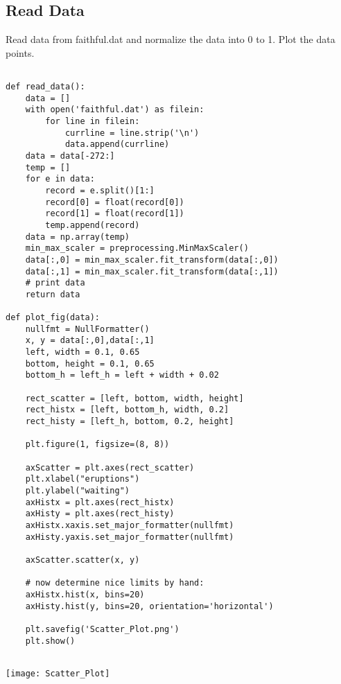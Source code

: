 \documentclass[a4paper]{article}
\begin{document}
\subsection*{Read Data}
Read data from faithful.dat and normalize the data into 0 to 1. Plot the data points.
\begin{lstlisting}

def read_data():
    data = []
    with open('faithful.dat') as filein:
        for line in filein:
            currline = line.strip('\n')
            data.append(currline)
    data = data[-272:]
    temp = []
    for e in data:
        record = e.split()[1:]
        record[0] = float(record[0])
        record[1] = float(record[1])
        temp.append(record)
    data = np.array(temp)
    min_max_scaler = preprocessing.MinMaxScaler()
    data[:,0] = min_max_scaler.fit_transform(data[:,0])
    data[:,1] = min_max_scaler.fit_transform(data[:,1])
    # print data    
    return data
    
def plot_fig(data):
    nullfmt = NullFormatter()
    x, y = data[:,0],data[:,1]
    left, width = 0.1, 0.65
    bottom, height = 0.1, 0.65
    bottom_h = left_h = left + width + 0.02
    
    rect_scatter = [left, bottom, width, height]
    rect_histx = [left, bottom_h, width, 0.2]
    rect_histy = [left_h, bottom, 0.2, height]
    
    plt.figure(1, figsize=(8, 8))

    axScatter = plt.axes(rect_scatter)
    plt.xlabel("eruptions")
    plt.ylabel("waiting")
    axHistx = plt.axes(rect_histx)
    axHisty = plt.axes(rect_histy)
    axHistx.xaxis.set_major_formatter(nullfmt)
    axHisty.yaxis.set_major_formatter(nullfmt)
    
    axScatter.scatter(x, y)
    
    # now determine nice limits by hand:
    axHistx.hist(x, bins=20)
    axHisty.hist(y, bins=20, orientation='horizontal')
    
    plt.savefig('Scatter_Plot.png')
    plt.show()
    
\end{lstlisting}
\begin{center}
	\texttt{[image: Scatter\_Plot]}
\end{center}
\end{document}
